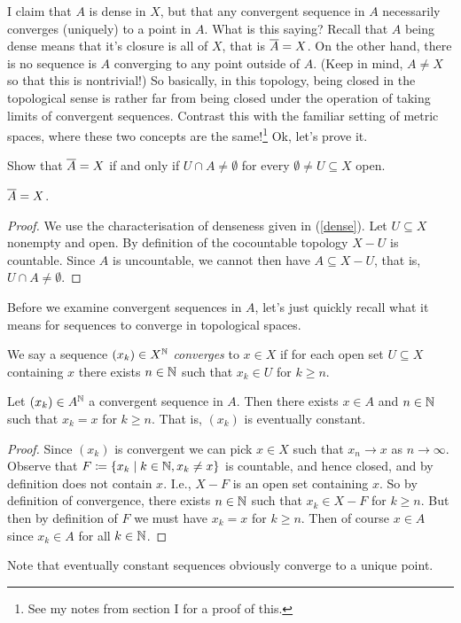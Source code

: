 I claim that $A$ is dense in $X$, but that any convergent sequence in
$A$ necessarily converges (uniquely) to a point in $A$. What is this
saying? Recall that $A$ being dense means that it's closure is all of
$X$, that is $\overline A = X$. On the other hand, there is no sequence
is $A$ converging to any point outside of $A$. (Keep in mind, $A \ne
X$ so that this is nontrivial!) So basically, in this topology, being
closed in the topological sense is rather far from being closed under
the operation of taking limits of convergent sequences. Contrast this
with the familiar setting of metric spaces, where these two concepts
are the same!\footnote{See my notes from section I for a proof of
  this.} Ok, let's prove it.

\begin{exercise}
  \label{dense}
  Show that $\overline A = X$ if and only if $U \cap A \ne \emptyset$ for
  every $\emptyset \ne U \subseteq X$ open.
\end{exercise}

\begin{lemma}
  $\overline A = X$.
\end{lemma}

\begin{proof}
  We use the characterisation of denseness given in (\ref{dense}). Let
  $U \subseteq X$ nonempty and open. By definition of the cocountable
  topology $X - U$ is countable. Since $A$ is uncountable, we cannot
  then have $A \subseteq X - U$, that is, $U \cap A \ne \emptyset$.
\end{proof}

Before we examine convergent sequences in $A$, let's just quickly
recall what it means for sequences to converge in topological spaces.

\begin{definition}
  We say a sequence $(x_k) \in X^{\mathbb{N}}$ \textit{converges} to $x \in X$
  if for each open set $U \subseteq X$ containing $x$ there exists $n
  \in \mathbb{N}$ such that $x_k \in U$ for $k \ge n$.
\end{definition}

\begin{lemma}
  Let $(x_k) \in A^{\mathbb{N}}$ a convergent sequence in $A$. Then there exists
  $x \in A$ and $n \in \mathbb{N}$ such that $x_k = x$ for $k \ge n$. That is,
  $(x_k)$ is \textup{eventually constant}.
\end{lemma}

\begin{proof}
  Since $(x_k)$ is convergent we can pick $x \in X$ such that $x_n \to
  x$ as $n \to \infty$. Observe that $F \coloneqq \{x_k \mid k \in \mathbb{N}, x_k
  \ne x\}$ is countable, and hence closed, and by definition does not
  contain $x$. I.e., $X - F$ is an open set containing $x$. So by
  definition of convergence, there exists $n \in \mathbb{N}$ such that $x_k
  \in X - F$ for $k \ge n$. But then by definition of $F$ we must have
  $x_k = x$ for $k \ge n$. Then of course $x \in A$ since $x_k \in A$
  for all $k \in \mathbb{N}$.
\end{proof}

Note that eventually constant sequences obviously converge to a unique
point.





